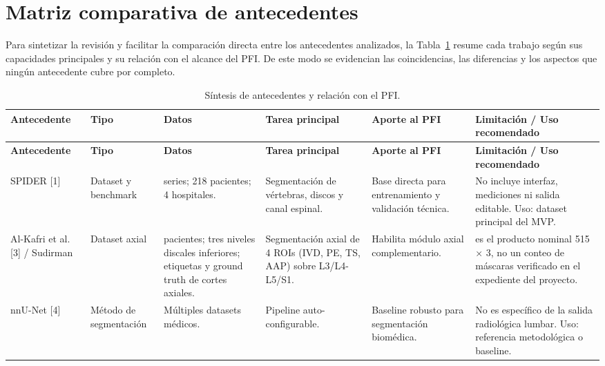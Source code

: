 \section{Matriz comparativa de antecedentes}

Para sintetizar la revisión y facilitar la comparación directa entre los antecedentes analizados, la Tabla~\ref{tab:estado-arte-antecedentes} resume cada trabajo según sus capacidades principales y su relación con el alcance del PFI. De este modo se evidencian las coincidencias, las diferencias y los aspectos que ningún antecedente cubre por completo.

\begingroup
\small
\sloppy
\setlength{\emergencystretch}{3em}
\setlength{\tabcolsep}{2pt}
\setlength{\LTleft}{0pt}
\setlength{\LTright}{0pt}
\renewcommand{\arraystretch}{1.15}
\begin{longtable}{|>{\raggedright\arraybackslash}p{}|>{\raggedright\arraybackslash}p{}|>{\raggedright\arraybackslash}p{}|>{\raggedright\arraybackslash}p{}|>{\raggedright\arraybackslash}p{}|>{\raggedright\arraybackslash}p{}|}
\caption{Síntesis de antecedentes y relación con el PFI.}
\label{tab:estado-arte-antecedentes}\\
\hline
\textbf{Antecedente} & \textbf{Tipo} & \textbf{Datos} & \textbf{Tarea principal} & \textbf{Aporte al PFI} & \textbf{Limitación / Uso recomendado} \\
\hline
\endfirsthead
\hline
\textbf{Antecedente} & \textbf{Tipo} & \textbf{Datos} & \textbf{Tarea principal} & \textbf{Aporte al PFI} & \textbf{Limitación / Uso recomendado} \\
\hline
\endhead
SPIDER [1] & Dataset y benchmark & 447 series; 218 pacientes; 4 hospitales. & Segmentación de vértebras, discos y canal espinal. & Base directa para entrenamiento y validación técnica. & No incluye interfaz, mediciones ni salida editable. Uso: dataset principal del MVP. \\
\hline
Al-Kafri et al. [3] / Sudirman & Dataset axial & 515 pacientes; tres niveles discales inferiores; etiquetas y ground truth de cortes axiales. & Segmentación axial de 4 ROIs (IVD, PE, TS, AAP) sobre L3/L4-L5/S1. & Habilita módulo axial complementario. & 1.545 es el producto nominal 515 × 3, no un conteo de máscaras verificado en el expediente del proyecto. \\
\hline
nnU-Net [4] & Método de segmentación & Múltiples datasets médicos. & Pipeline auto-configurable. & Baseline robusto para segmentación biomédica. & No es específico de la salida radiológica lumbar. Uso: referencia metodológica o baseline. \\

\end{longtable}
